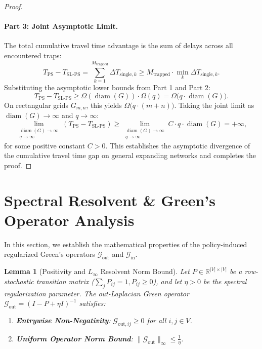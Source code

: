 \documentclass[11pt,a4paper]{article}
\newtheorem{lemma}{Lemma}
\begin{document}
\begin{proof}
\paragraph{Part 3: Joint Asymptotic Limit.}
The total cumulative travel time advantage is the sum of delays across all encountered traps:
\begin{equation}
T_{\text{PS}} - T_{\text{SL-PS}} = \sum_{k=1}^{M_{\text{trapped}}} \Delta T_{\text{single}, k} \ge M_{\text{trapped}} \cdot \min_k \Delta T_{\text{single}, k}.
\end{equation}
Substituting the asymptotic lower bounds from Part 1 and Part 2:
\begin{equation}
T_{\text{PS}} - T_{\text{SL-PS}} \ge \Omega(\operatorname{diam}(G)) \cdot \Omega(q) = \Omega\big(q \cdot \operatorname{diam}(G)\big).
\end{equation}
On rectangular grids $G_{m,n}$, this yields $\Omega\big(q \cdot (m + n)\big)$. Taking the joint limit as $\operatorname{diam}(G) \to \infty$ and $q \to \infty$:
\begin{equation}
\lim_{\substack{\operatorname{diam}(G) \to \infty \\ q \to \infty}} \left( T_{\text{PS}} - T_{\text{SL-PS}} \right) \ge \lim_{\substack{\operatorname{diam}(G) \to \infty \\ q \to \infty}} C \cdot q \cdot \operatorname{diam}(G) = +\infty,
\end{equation}
for some positive constant $C > 0$. This establishes the asymptotic divergence of the cumulative travel time gap on general expanding networks and completes the proof.
\end{proof}

\section{Spectral Resolvent \& Green's Operator Analysis}
\label{sec:appendix_spectral}

In this section, we establish the mathematical properties of the policy-induced regularized Green's operators $\mathcal{G}_{\text{out}}$ and $\mathcal{G}_{\text{in}}$.

\begin{lemma}[Positivity and $L_\infty$ Resolvent Norm Bound]
\label{lem:green_norm}
Let $P \in \mathbb{R}^{|V| \times |V|}$ be a row-stochastic transition matrix ($\sum_j P_{ij} = 1, P_{ij} \ge 0$), and let $\eta > 0$ be the spectral regularization parameter. The out-Laplacian Green operator $\mathcal{G}_{\text{out}} = (I - P + \eta I)^{-1}$ satisfies:
\begin{enumerate}
    \item \textbf{Entrywise Non-Negativity}: $\mathcal{G}_{\text{out}, ij} \ge 0$ for all $i, j \in V$.
    \item \textbf{Uniform Operator Norm Bound}: $\|\mathcal{G}_{\text{out}}\|_\infty \le \frac{1}{\eta}$.
\end{enumerate}
\end{lemma}
\end{document}
